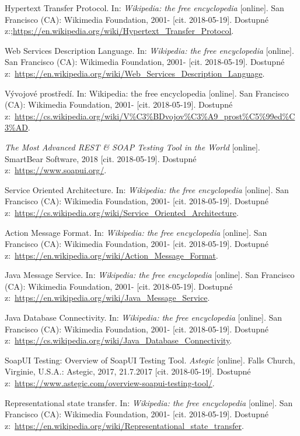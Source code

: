 \documentclass[a4paper,12pt]{article}
\begin{document}
{  Hypertext Transfer Protocol. In: \textit{Wikipedia: the free encyclopedia} [online]. San Francisco (CA): Wikimedia Foundation, 2001- [cit. 2018-05-19]. Dostupné z:;\url{https://en.wikipedia.org/wiki/Hypertext_Transfer_Protocol}.
  
  Web Services Description Language. In: \textit{Wikipedia: the free encyclopedia} [online]. San Francisco (CA): Wikimedia Foundation, 2001- [cit. 2018-05-19]. Dostupné z:~\url{https://en.wikipedia.org/wiki/Web_Services_Description_Language}.
  
  Vývojové prostředí. In: Wikipedia: the free encyclopedia [online]. San Francisco (CA): Wikimedia Foundation, 2001- [cit. 2018-05-19]. Dostupné z:~\url{https://cs.wikipedia.org/wiki/V\%C3\%BDvojov\%C3\%A9_prost\%C5\%99ed\%C3\%AD}.
 
  \textit{The Most Advanced REST \& SOAP Testing Tool in the World} [online]. SmartBear Software, 2018 [cit. 2018-05-19]. Dostupné z:~\url{https://www.soapui.org/}.
 
  Service Oriented Architecture. In: \textit{Wikipedia: the free encyclopedia} [online]. San Francisco (CA): Wikimedia Foundation, 2001- [cit. 2018-05-19]. Dostupné z:~\url{https://cs.wikipedia.org/wiki/Service_Oriented_Architecture}.
  
  Action Message Format. In: \textit{Wikipedia: the free encyclopedia} [online]. San Francisco (CA): Wikimedia Foundation, 2001- [cit. 2018-05-19]. Dostupné z:~\url{https://en.wikipedia.org/wiki/Action_Message_Format}.
  
  Java Message Service. In: \textit{Wikipedia: the free encyclopedia} [online]. San Francisco (CA): Wikimedia Foundation, 2001- [cit. 2018-05-19]. Dostupné z:~\url{https://en.wikipedia.org/wiki/Java_Message_Service}.
  
  Java Database Connectivity. In: \textit{Wikipedia: the free encyclopedia} [online]. San Francisco (CA): Wikimedia Foundation, 2001- [cit. 2018-05-19]. Dostupné z:~\url{https://cs.wikipedia.org/wiki/Java_Database_Connectivity}.
  
  SoapUI Testing: Overview of SoapUI Testing Tool. \textit{Astegic} [online]. Falls Church, Virginie, U.S.A.: Astegic, 2017, 21.7.2017 [cit. 2018-05-19]. Dostupné z:~\url{https://www.astegic.com/overview-soapui-testing-tool/}.
  
  
  Representational state transfer. In: \textit{Wikipedia: the free encyclopedia} [online]. San Francisco (CA): Wikimedia Foundation, 2001- [cit. 2018-05-19]. Dostupné z:~\url{https://en.wikipedia.org/wiki/Representational_state_transfer}.
  
}
\end{document}

